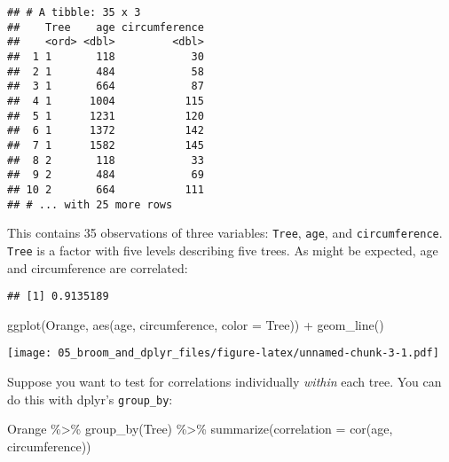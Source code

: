 \documentclass[
]{book}
\newenvironment{Shaded}{\begin{snugshade}}{\end{snugshade}}
\newcommand{\AttributeTok}[1]{\textcolor[rgb]{0.77,0.63,0.00}{#1}}
\newcommand{\FunctionTok}[1]{\textcolor[rgb]{0.00,0.00,0.00}{#1}}
\newcommand{\NormalTok}[1]{#1}
\newcommand{\SpecialCharTok}[1]{\textcolor[rgb]{0.00,0.00,0.00}{#1}}
\begin{document}
\begin{verbatim}
## # A tibble: 35 x 3
##    Tree    age circumference
##    <ord> <dbl>         <dbl>
##  1 1       118            30
##  2 1       484            58
##  3 1       664            87
##  4 1      1004           115
##  5 1      1231           120
##  6 1      1372           142
##  7 1      1582           145
##  8 2       118            33
##  9 2       484            69
## 10 2       664           111
## # ... with 25 more rows
\end{verbatim}

This contains 35 observations of three variables: \texttt{Tree}, \texttt{age}, and \texttt{circumference}. \texttt{Tree} is a factor with five levels describing five trees. As might be expected, age and circumference are correlated:

\begin{Shaded}
\end{Shaded}

\begin{verbatim}
## [1] 0.9135189
\end{verbatim}

\begin{Shaded}
\begin{Highlighting}[]
\FunctionTok{ggplot}\NormalTok{(Orange, }\FunctionTok{aes}\NormalTok{(age, circumference, }\AttributeTok{color =}\NormalTok{ Tree)) }\SpecialCharTok{+}
  \FunctionTok{geom\_line}\NormalTok{()}
\end{Highlighting}
\end{Shaded}

\texttt{[image: 05\_broom\_and\_dplyr\_files/figure-latex/unnamed-chunk-3-1.pdf]}

Suppose you want to test for correlations individually \emph{within} each tree. You can do this with dplyr's \texttt{group\_by}:

\begin{Shaded}
\begin{Highlighting}[]
\NormalTok{Orange }\SpecialCharTok{\%\textgreater{}\%}
  \FunctionTok{group\_by}\NormalTok{(Tree) }\SpecialCharTok{\%\textgreater{}\%}
  \FunctionTok{summarize}\NormalTok{(}\AttributeTok{correlation =} \FunctionTok{cor}\NormalTok{(age, circumference))}
\end{Highlighting}
\end{Shaded}
\end{document}
